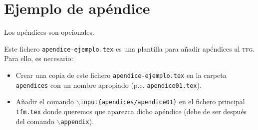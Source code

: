 
\chapter{Ejemplo de apéndice}\label{ap:apendice1}

Los apéndices son opcionales.

Este fichero \texttt{apendice-ejemplo.tex} es una plantilla para añadir apéndices al \textsc{tfg}. Para ello, es necesario:
\begin{itemize}
  \item Crear una copia de este fichero \texttt{apendice-ejemplo.tex} en la carpeta \texttt{apendices} con un nombre apropiado (p.e. \texttt{apendice01.tex}).
  \item Añadir el comando \texttt{$\backslash$input\{apendices/apendice01\}} en el fichero principal \texttt{tfm.tex} donde queremos que aparezca dicho apéndice (debe de ser después del comando \texttt{$\backslash$appendix}).
\end{itemize}

\endinput
